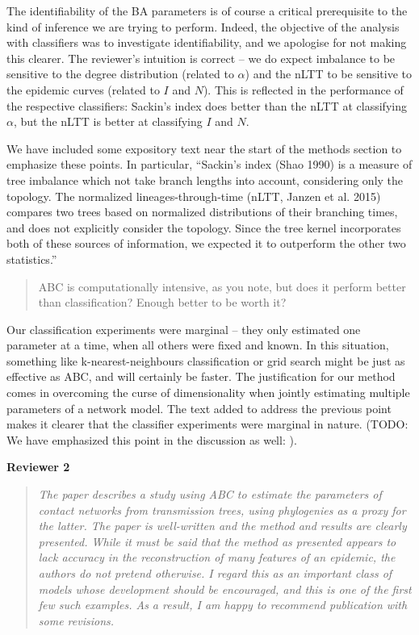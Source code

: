 \documentclass[12pt]{letter}
\begin{document}
\begin{letter}{ }
The identifiability of the BA parameters is of course a critical prerequisite
to the kind of inference we are trying to perform. Indeed, the objective of the 
analysis with classifiers was to investigate identifiability, and we apologise
for not making this clearer. The reviewer's intuition is correct -- we do
expect imbalance to be sensitive to the degree distribution (related to
$\alpha$) and the nLTT to be sensitive to the epidemic curves (related to $I$
and $N$). This is reflected in the performance of the respective classifiers:
Sackin's index does better than the nLTT at classifying $\alpha$, but the nLTT
is better at classifying $I$ and $N$.

We have included some expository text near the start of the methods section to
emphasize these points. In particular, ``Sackin's index (Shao 1990)
is a measure of tree imbalance which not take branch lengths into account,
considering only the topology. The normalized lineages-through-time (nLTT,
Janzen et al. 2015) compares two trees based on normalized distributions of
their branching times, and does not explicitly consider the topology. Since the
tree kernel incorporates both of these sources of information, we expected it
to outperform the other two statistics.''

\begin{quote}
  \itshape

  ABC is computationally intensive, as you note, but does it perform better
  than classification? Enough better to be worth it?
\end{quote}

Our classification experiments were marginal -- they only estimated one
parameter at a time, when all others were fixed and known. In this situation,
something like k-nearest-neighbours classification or grid search might be just
as effective as ABC, and will certainly be faster. The justification for our
method comes in overcoming the curse of dimensionality when jointly estimating
multiple parameters of a network model. The text added to address the previous
point makes it clearer that the classifier experiments were marginal in nature.
(TODO: We have emphasized this point in the discussion as well: ).

\textbf{Reviewer 2}

\begin{quote}
  \itshape
  The paper describes a study using ABC to estimate the parameters of contact
  networks from transmission trees, using phylogenies as a proxy for the
  latter. The paper is well-written and the method and results are clearly
  presented. While it must be said that the method as presented appears to lack
  accuracy in the reconstruction of many features of an epidemic, the authors
  do not pretend otherwise. I regard this as an important class of models whose
  development should be encouraged, and this is one of the first few such
  examples. As a result, I am happy to recommend publication with some
  revisions. \\


\end{quote}
\end{letter}
\end{document}

